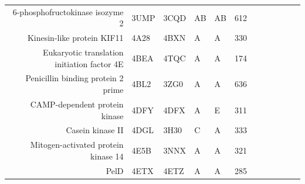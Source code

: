 \begin{table}
\begin{changemargin}{15mm}
\begin{scriptsize}
\begin{tabular}{ r p{0.8cm} p{0.8cm} p{0.8cm} p{0.8cm} l l l l l l l }
6-phosphofructokinase isozyme 2                          & 3UMP & 3CQD & AB    & AB    & 612 & \cellcolor[rgb]{ .573,  .816,  .314} & \cellcolor[rgb]{ .573,  .816,  .314} & \cellcolor[rgb]{ .573,  .816,  .314} & \cellcolor[rgb]{ 1,  .494,  .475}    & \cellcolor[rgb]{ .573,  .816,  .314} & \cellcolor[rgb]{ 1,  .494,  .475}    \\
Kinesin-like protein KIF11                               & 4A28 & 4BXN & A     & A     & 330 & \cellcolor[rgb]{ .573,  .816,  .314} & \cellcolor[rgb]{ .573,  .816,  .314} & \cellcolor[rgb]{ .573,  .816,  .314} & \cellcolor[rgb]{ .573,  .816,  .314} & \cellcolor[rgb]{ .573,  .816,  .314} & \cellcolor[rgb]{ .573,  .816,  .314} \\
Eukaryotic translation initiation factor 4E              & 4BEA & 4TQC & A     & A     & 174 & \cellcolor[rgb]{ 1,  .494,  .475}    & \cellcolor[rgb]{ 1,  .494,  .475}    & \cellcolor[rgb]{ 1,  1,  0}          & \cellcolor[rgb]{ 1,  .494,  .475}    & \cellcolor[rgb]{ 1,  .494,  .475}    & \cellcolor[rgb]{ 1,  .494,  .475}    \\
Penicillin binding protein 2 prime                       & 4BL2 & 3ZG0 & A     & A     & 636 & \cellcolor[rgb]{ 1,  .494,  .475}    & \cellcolor[rgb]{ .573,  .816,  .314} & \cellcolor[rgb]{ 1,  .494,  .475}    & \cellcolor[rgb]{ 1,  .494,  .475}    & \cellcolor[rgb]{ 1,  .494,  .475}    & \cellcolor[rgb]{ 1,  .494,  .475}    \\
CAMP-dependent protein kinase                            & 4DFY & 4DFX & A     & E     & 311 & \cellcolor[rgb]{ .573,  .816,  .314} & \cellcolor[rgb]{ .573,  .816,  .314} & \cellcolor[rgb]{ 1,  .494,  .475}    & \cellcolor[rgb]{ 1,  .494,  .475}    & \cellcolor[rgb]{ .573,  .816,  .314} & \cellcolor[rgb]{ .573,  .816,  .314} \\
Casein kinase II                                         & 4DGL & 3H30 & C     & A     & 333 & \cellcolor[rgb]{ .573,  .816,  .314} & \cellcolor[rgb]{ 1,  .494,  .475}    & \cellcolor[rgb]{ 1,  .494,  .475}    & \cellcolor[rgb]{ .573,  .816,  .314} & \cellcolor[rgb]{ 1,  .494,  .475}    & \cellcolor[rgb]{ .573,  .816,  .314} \\
Mitogen-activated protein kinase 14                      & 4E5B & 3NNX & A     & A     & 321 & \cellcolor[rgb]{ .573,  .816,  .314} & \cellcolor[rgb]{ 1,  .494,  .475}    & \cellcolor[rgb]{ 1,  .494,  .475}    & \cellcolor[rgb]{ .573,  .816,  .314} & \cellcolor[rgb]{ .573,  .816,  .314} & \cellcolor[rgb]{ .573,  .816,  .314} \\
PelD                                                     & 4ETX & 4ETZ & A     & A     & 285 & \cellcolor[rgb]{ 1,  .494,  .475}    & \cellcolor[rgb]{ 1,  .494,  .475}    & \cellcolor[rgb]{ .573,  .816,  .314} & \cellcolor[rgb]{ 1,  .494,  .475}    & \cellcolor[rgb]{ 1,  .494,  .475}    & \cellcolor[rgb]{ 1,  .494,  .475}    \\

\end{tabular}
\end{scriptsize}
\end{changemargin}
\end{table}
